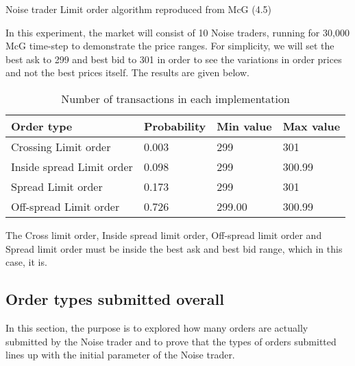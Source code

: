 \begin{algorithm}[H]
\DontPrintSemicolon 
{}
            {
            
            }
\caption{{\sc Noise trader Limit order algorithm reproduced from McG (4.5) \cite{McGroarty}}}
\end{algorithm}

In this experiment, the market will consist of 10 Noise traders, running for 30,000 McG time-step to demonstrate the price ranges. For simplicity, we will set the best ask to 299 and best bid to 301 in order to see the variations in order prices and not the best prices itself. The results are given below. 

\begin{table}[h]
\centering
\begin{tabular}{ |l||l|l|l|} 
\hline
\textbf{Order type}& \textbf{Probability} & \textbf{Min value} & \textbf{Max value} \\
\hline
\hline
Crossing Limit order & 0.003 & 299 & 301 \\ 
\hline
Inside spread Limit order & 0.098 & 299 & 300.99 \\ 
\hline
Spread Limit order & 0.173 & 299 & 301 \\ 
\hline
Off-spread Limit order & 0.726 & 299.00& 300.99 \\ 
\hline
\end{tabular}
\caption{Number of transactions in each implementation}  
\end{table}
\FloatBarrier

The Cross limit order, Inside spread limit order, Off-spread limit order and Spread limit order must be inside the best ask and best bid range, which in this case, it is. 

\subsection{Order types submitted overall}

In this section, the purpose is to explored how many orders are actually submitted by the Noise trader and to prove that the types of orders submitted lines up with the initial parameter of the Noise trader. 

